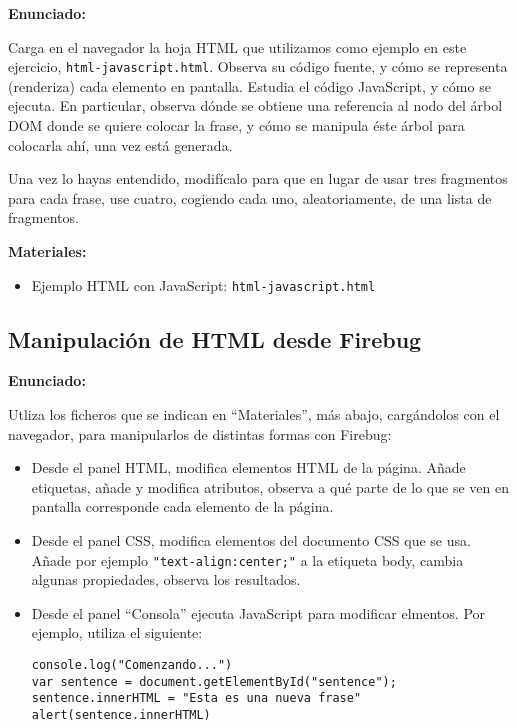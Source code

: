 \textbf{Enunciado:}

Carga en el navegador la hoja HTML que utilizamos como ejemplo en este ejercicio, \verb|html-javascript.html|. Observa su código fuente, y cómo se representa (renderiza) cada elemento en pantalla. Estudia el código JavaScript, y cómo se ejecuta. En particular, observa dónde se obtiene una referencia al nodo del árbol DOM donde se quiere colocar la frase, y cómo se manipula éste árbol para colocarla ahí, una vez está generada.

Una vez lo hayas entendido, modifícalo para que en lugar de usar tres fragmentos para cada frase, use cuatro, cogiendo cada uno, aleatoriamente, de una lista de fragmentos.

\textbf{Materiales:}

\begin{itemize}
\item Ejemplo HTML con JavaScript: \verb|html-javascript.html|
\end{itemize}


\subsection{Manipulación de HTML desde Firebug}
\label{subsec:eje-html-firebug}

\textbf{Enunciado:}

Utliza los ficheros que se indican en ``Materiales'', más abajo, cargándolos con el navegador, para manipularlos de distintas formas con Firebug:

\begin{itemize}
\item Desde el panel HTML, modifica elementos HTML de la página. Añade etiquetas, añade y modifica atributos, observa a qué parte de lo que se ven en pantalla corresponde cada elemento de la página.
\item Desde el panel CSS, modifica elementos del documento CSS que se usa. Añade por ejemplo \verb|"text-align:center;"| a la etiqueta body, cambia algunas propiedades, observa los resultados.
\item Desde el panel ``Consola'' ejecuta JavaScript para modificar elmentos. Por ejemplo, utiliza el siguiente:

\begin{verbatim}
console.log("Comenzando...")
var sentence = document.getElementById("sentence");
sentence.innerHTML = "Esta es una nueva frase"
alert(sentence.innerHTML)
\end{verbatim}
\end{itemize}

